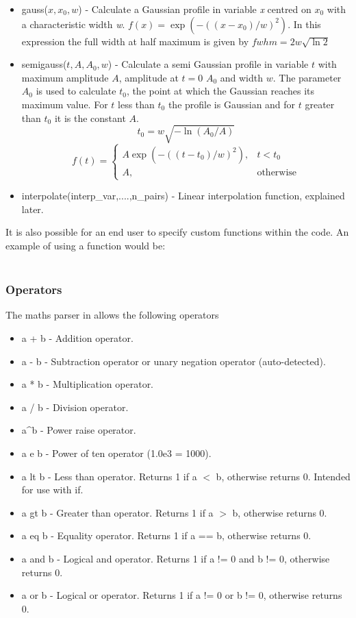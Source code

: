 \begin{itemize}
\item gauss($x,x_0,w$) - Calculate a Gaussian profile in variable
    {\it x} centred on {\it $x_0$} with a characteristic width {\it w}.
    $f(x) = \exp{(-((x-x_0)/w)^2)}$. In this expression the
    full width at half maximum is given by $fwhm = 2 w \sqrt{\ln{2}}$
\item semigauss($t,A,A_0,w$) - Calculate a semi Gaussian profile in variable
    $t$ with maximum amplitude $A$, amplitude at $t=0$ $A_0$ and width $w$.
    The parameter $A_0$ is used to calculate $t_0$, the point at which the
    Gaussian reaches its maximum value. For $t$ less than $t_0$ the profile
    is Gaussian and for $t$ greater than $t_0$ it is the constant $A$.
\[
t_0 = w\sqrt{-\ln{(A_0/A)}}
\]\[
f(t) =
\begin{cases}
A \exp{(-((t-t_0)/w)^2)}, & t < t_0 \\
A, & \mbox{otherwise}
\end{cases}
\]
\item interpolate(interp\_var,....,n\_pairs) - Linear interpolation function,
  explained later.
\end{itemize}

It is also possible for an end user to specify custom functions within the
code. An example of using a function would be:\\
\indent{}\\

\subsubsection{Operators}
The maths parser in {\EPOCH} allows the following operators
\begin{itemize}
\item a + b - Addition operator.
\item a - b - Subtraction operator or unary negation operator (auto-detected).
\item a * b - Multiplication operator.
\item a / b - Division operator.
\item a\^{}b - Power raise operator.
\item a e b - Power of ten operator (1.0e3 = 1000).
\item a lt b - Less than operator. Returns 1 if a $<$ b, otherwise returns
  0. Intended for use with if.
\item a gt b - Greater than operator. Returns 1 if a $>$ b, otherwise returns 0.
\item a eq b - Equality operator. Returns 1 if a == b, otherwise returns 0.
\item a and b - Logical and operator. Returns 1 if a != 0 and b != 0,
  otherwise returns 0.
\item a or b - Logical or operator. Returns 1 if a != 0 or b != 0, otherwise
  returns 0.
\end{itemize}

